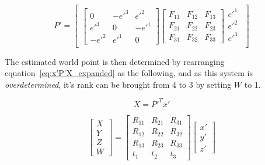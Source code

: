 \documentclass[12pt]{article}
\begin{document}
\begin{equation}
        P'=
    \begin{bmatrix}
        \begin{bmatrix}
             0      & -e'^{3} &  e'^{2}\\
             e'^{3} &  0      & -e'^{1}\\
            -e'^{2} &  e'^{1} &  0
        \end{bmatrix}
        \begin{bmatrix}
            F_{11} & F_{12} & F_{13}\\
            F_{21} & F_{22} & F_{23}\\
            F_{31} & F_{32} & F_{33}
        \end{bmatrix}
        \begin{matrix}
            e'^{1}\\
            e'^{2}\\
            e'^{3}\\
        \end{matrix}
    \end{bmatrix}
\end{equation}

The estimated world point is then determined by rearranging equation~\eqref{eq:x'P'X_expanded} as the following, and as this system is \textit{overdetermined}, it's rank can be brought from 4 to 3 by setting $W$ to 1.

\begin{equation}
    X=P'^{T}x'
\end{equation}

\begin{equation}
    \begin{bmatrix}
        X\\
        Y\\
        Z\\
        W
    \end{bmatrix}
    =
    \begin{bmatrix}
        R_{11} & R_{21} & R_{31}\\
        R_{12} & R_{22} & R_{32}\\
        R_{13} & R_{23} & R_{33}\\
        t_1    & t_2    & t_3
    \end{bmatrix}
    \begin{bmatrix}
        x'\\
        y'\\
        z'
    \end{bmatrix}
\end{equation}
\end{document}
